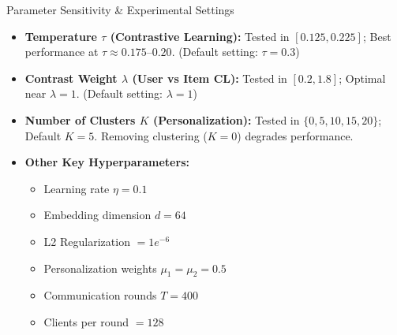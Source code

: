 \documentclass{beamer}
\begin{document}
\begin{frame}{Parameter Sensitivity \& Experimental Settings}
\small
\begin{itemize}

\item \textbf{Temperature $\tau$ (Contrastive Learning):}
      Tested in $[0.125, 0.225]$; 
      Best performance at $\tau \approx 0.175$--$0.20$.
      (Default setting: $\tau = 0.3$)

\item \textbf{Contrast Weight $\lambda$ (User vs Item CL):}
      Tested in $[0.2, 1.8]$; 
      Optimal near $\lambda = 1$.
      (Default setting: $\lambda = 1$)

\item \textbf{Number of Clusters $K$ (Personalization):}
      Tested in $\{0,5,10,15,20\}$; 
      Default $K = 5$.
      Removing clustering ($K=0$) degrades performance.

\item \textbf{Other Key Hyperparameters:}
      \begin{itemize}
          \item Learning rate $\eta = 0.1$
          \item Embedding dimension $d = 64$
          \item L2 Regularization $= 1e^{-6}$
          \item Personalization weights $\mu_1 = \mu_2 = 0.5$
          \item Communication rounds $T = 400$
          \item Clients per round $= 128$
      \end{itemize}

\end{itemize}

\end{frame}
\end{document}
